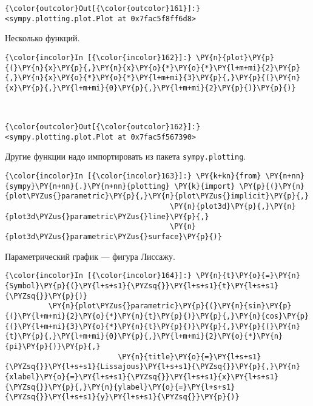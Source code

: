             \begin{Verbatim}[commandchars=\\\{\}]
{\color{outcolor}Out[{\color{outcolor}161}]:} <sympy.plotting.plot.Plot at 0x7fac5f8ff6d8>
\end{Verbatim}
        
    Несколько функций.

    \begin{Verbatim}[commandchars=\\\{\}]
{\color{incolor}In [{\color{incolor}162}]:} \PY{n}{plot}\PY{p}{(}\PY{n}{x}\PY{p}{,}\PY{n}{x}\PY{o}{*}\PY{o}{*}\PY{l+m+mi}{2}\PY{p}{,}\PY{n}{x}\PY{o}{*}\PY{o}{*}\PY{l+m+mi}{3}\PY{p}{,}\PY{p}{(}\PY{n}{x}\PY{p}{,}\PY{l+m+mi}{0}\PY{p}{,}\PY{l+m+mi}{2}\PY{p}{)}\PY{p}{)}
\end{Verbatim}

    \begin{center}
    \end{center}
    { \hspace*{\fill} \\}
    
            \begin{Verbatim}[commandchars=\\\{\}]
{\color{outcolor}Out[{\color{outcolor}162}]:} <sympy.plotting.plot.Plot at 0x7fac5f567390>
\end{Verbatim}
        
    Другие функции надо импортировать из пакета \texttt{sympy.plotting}.

    \begin{Verbatim}[commandchars=\\\{\}]
{\color{incolor}In [{\color{incolor}163}]:} \PY{k+kn}{from} \PY{n+nn}{sympy}\PY{n+nn}{.}\PY{n+nn}{plotting} \PY{k}{import} \PY{p}{(}\PY{n}{plot\PYZus{}parametric}\PY{p}{,}\PY{n}{plot\PYZus{}implicit}\PY{p}{,}
                                      \PY{n}{plot3d}\PY{p}{,}\PY{n}{plot3d\PYZus{}parametric\PYZus{}line}\PY{p}{,}
                                      \PY{n}{plot3d\PYZus{}parametric\PYZus{}surface}\PY{p}{)}
\end{Verbatim}

    Параметрический график --- фигура Лиссажу.

    \begin{Verbatim}[commandchars=\\\{\}]
{\color{incolor}In [{\color{incolor}164}]:} \PY{n}{t}\PY{o}{=}\PY{n}{Symbol}\PY{p}{(}\PY{l+s+s1}{\PYZsq{}}\PY{l+s+s1}{t}\PY{l+s+s1}{\PYZsq{}}\PY{p}{)}
          \PY{n}{plot\PYZus{}parametric}\PY{p}{(}\PY{n}{sin}\PY{p}{(}\PY{l+m+mi}{2}\PY{o}{*}\PY{n}{t}\PY{p}{)}\PY{p}{,}\PY{n}{cos}\PY{p}{(}\PY{l+m+mi}{3}\PY{o}{*}\PY{n}{t}\PY{p}{)}\PY{p}{,}\PY{p}{(}\PY{n}{t}\PY{p}{,}\PY{l+m+mi}{0}\PY{p}{,}\PY{l+m+mi}{2}\PY{o}{*}\PY{n}{pi}\PY{p}{)}\PY{p}{,}
                          \PY{n}{title}\PY{o}{=}\PY{l+s+s1}{\PYZsq{}}\PY{l+s+s1}{Lissajous}\PY{l+s+s1}{\PYZsq{}}\PY{p}{,}\PY{n}{xlabel}\PY{o}{=}\PY{l+s+s1}{\PYZsq{}}\PY{l+s+s1}{x}\PY{l+s+s1}{\PYZsq{}}\PY{p}{,}\PY{n}{ylabel}\PY{o}{=}\PY{l+s+s1}{\PYZsq{}}\PY{l+s+s1}{y}\PY{l+s+s1}{\PYZsq{}}\PY{p}{)}
\end{Verbatim}

